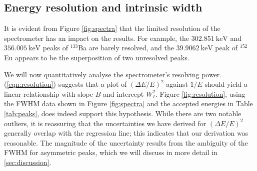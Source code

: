 \documentclass[twocol]{ametsocV6.1}
\begin{document}
\begin{table}[ht]
    \centering \scriptsize
    \cprotect\caption{%
    	Accepted values for the energies of the peaks in Figure
    	\ref{fig:spectra}, the corresponding predictions using
    	the calibration equation (\ref{eqn:calibration}) and the errors
    	as fractions of the prediction uncertainties.
    	Of course, the energies of the peaks that were used to generate
    	the calibration cannot be predicted using the same calibration,
    	and are left blank.
    }
    \label{tab:peaks}
\end{table}

\subsection{Energy resolution and intrinsic width}\label{sec:resolution}
It is evident from Figure \ref{fig:spectra} that the limited resolution of
the spectrometer has an impact on the results. For example, the
$\SI{302.851}{\kilo\electronvolt}$ and $\SI{356.005}{\kilo\electronvolt}$
peaks of $^{133}$Ba are barely resolved, and the
$\SI{39.9062}{\kilo\electronvolt}$ peak of $^{152}$Eu appears to be the
superposition of two unresolved peaks.

We will now quantitatively analyse the spectrometer's resolving power.
(\ref{eqn:resolution}) suggests that a plot of $(\Delta E/E)^2$ against
$1/E$ should yield a linear relationship with slope $B$ and intercept
$W_I^2$. Figure \ref{fig:resolution}, using the FWHM data shown in 
Figure \ref{fig:spectra} and the accepted energies
in Table \ref{tab:peaks}, does indeed support this hypothesis.
While there are two notable outliers, it is reassuring that the uncertainties
we have derived for $(\Delta E/E)^2$ generally overlap with the regression
line; this indicates that our derivation was reasonable. The magnitude
of the uncertainty results from the ambiguity of the FWHM for asymmetric
peaks, which we will discuss in more detail in \autoref{sec:discussion}.
\end{document}
